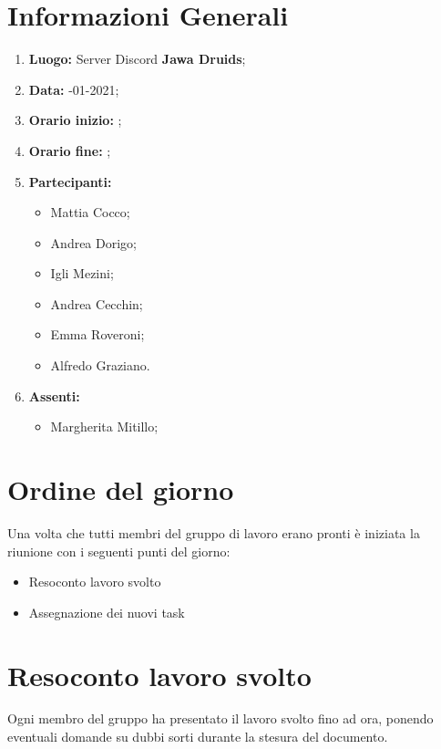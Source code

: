 \newpage
	\section{Informazioni Generali}
	\begin{enumerate}
		\item \textbf{Luogo:} \normalfont Server Discord \textbf{Jawa Druids};
		\item \textbf{Data:} -01-2021;
		\item \textbf{Orario inizio:} ;
		\item \textbf{Orario fine:} ;
		\item \textbf{Partecipanti:}
		\begin{itemize}
			\item Mattia Cocco;
			\item Andrea Dorigo;
			\item Igli Mezini;
			\item Andrea Cecchin;
			\item Emma Roveroni;
			\item Alfredo Graziano.
		\end{itemize}
		\item \textbf{Assenti:}
		\begin{itemize}
			\item Margherita Mitillo;
		\end{itemize}
	\end{enumerate}
	\section{Ordine del giorno}
	Una volta che tutti membri del gruppo di lavoro erano pronti è iniziata la riunione con i seguenti punti del giorno:
	\begin{itemize}
		\item Resoconto lavoro svolto
		\item Assegnazione dei nuovi task
	\end{itemize}

	\section{Resoconto lavoro svolto}
	Ogni membro del gruppo ha presentato il lavoro svolto fino ad ora, ponendo eventuali domande su dubbi sorti durante la stesura del documento.

